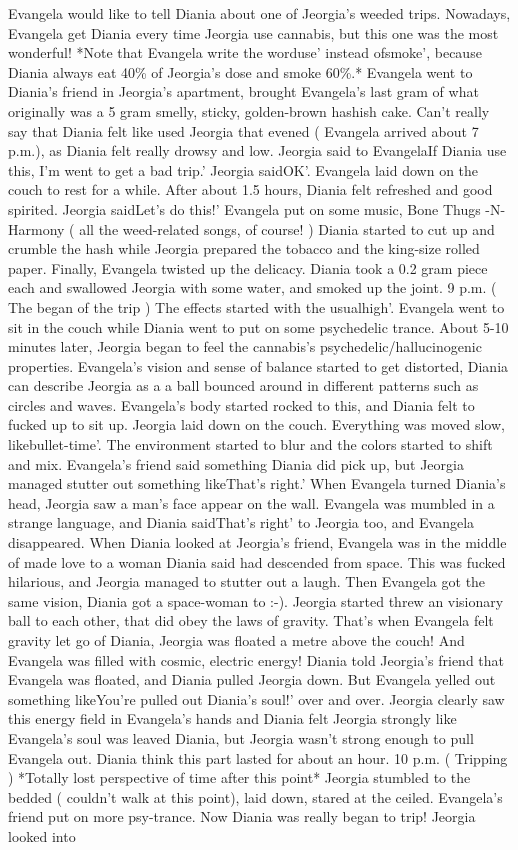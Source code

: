\documentclass[12pt]{book}
\begin{document}
Evangela would like to tell Diania about one of Jeorgia's weeded trips. Nowadays, Evangela get Diania every time Jeorgia use cannabis, but this one was the most wonderful! *Note that Evangela write the worduse' instead ofsmoke', because Diania always eat 40\% of Jeorgia's dose and smoke 60\%.* Evangela went to Diania's friend in Jeorgia's apartment, brought Evangela's last gram of what originally was a 5 gram smelly, sticky, golden-brown hashish cake. Can't really say that Diania felt like used Jeorgia that evened ( Evangela arrived about 7 p.m.), as Diania felt really drowsy and low. Jeorgia said to EvangelaIf Diania use this, I'm went to get a bad trip.' Jeorgia saidOK'. Evangela laid down on the couch to rest for a while. After about 1.5 hours, Diania felt refreshed and good spirited. Jeorgia saidLet's do this!' Evangela put on some music, Bone Thugs -N- Harmony ( all the weed-related songs, of course! ) Diania started to cut up and crumble the hash while Jeorgia prepared the tobacco and the king-size rolled paper. Finally, Evangela twisted up the delicacy. Diania took a 0.2 gram piece each and swallowed Jeorgia with some water, and smoked up the joint. 9 p.m. ( The began of the trip ) The effects started with the usualhigh'. Evangela went to sit in the couch while Diania went to put on some psychedelic trance. About 5-10 minutes later, Jeorgia began to feel the cannabis's psychedelic/hallucinogenic properties. Evangela's vision and sense of balance started to get distorted, Diania can describe Jeorgia as a a ball bounced around in different patterns such as circles and waves. Evangela's body started rocked to this, and Diania felt to fucked up to sit up. Jeorgia laid down on the couch. Everything was moved slow, likebullet-time'. The environment started to blur and the colors started to shift and mix. Evangela's friend said something Diania did pick up, but Jeorgia managed stutter out something likeThat's right.' When Evangela turned Diania's head, Jeorgia saw a man's face appear on the wall. Evangela was mumbled in a strange language, and Diania saidThat's right' to Jeorgia too, and Evangela disappeared. When Diania looked at Jeorgia's friend, Evangela was in the middle of made love to a woman Diania said had descended from space. This was fucked hilarious, and Jeorgia managed to stutter out a laugh. Then Evangela got the same vision, Diania got a space-woman to :-). Jeorgia started threw an visionary ball to each other, that did obey the laws of gravity. That's when Evangela felt gravity let go of Diania, Jeorgia was floated a metre above the couch! And Evangela was filled with cosmic, electric energy! Diania told Jeorgia's friend that Evangela was floated, and Diania pulled Jeorgia down. But Evangela yelled out something likeYou're pulled out Diania's soul!' over and over. Jeorgia clearly saw this energy field in Evangela's hands and Diania felt Jeorgia strongly like Evangela's soul was leaved Diania, but Jeorgia wasn't strong enough to pull Evangela out. Diania think this part lasted for about an hour. 10 p.m. ( Tripping ) *Totally lost perspective of time after this point* Jeorgia stumbled to the bedded ( couldn't walk at this point), laid down, stared at the ceiled. Evangela's friend put on more psy-trance. Now Diania was really began to trip! Jeorgia looked into 
\end{document}
